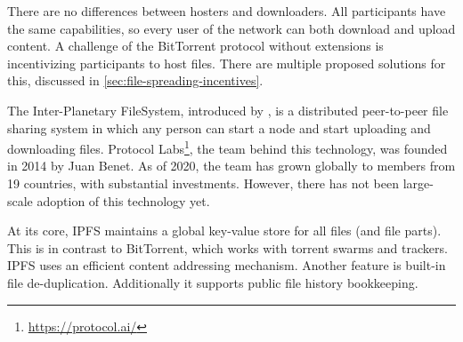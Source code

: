 


There are no differences between hosters and downloaders. All participants have the same capabilities, so every user of the network can both download and upload content. A challenge of the BitTorrent protocol without extensions is incentivizing participants to host files. There are multiple proposed solutions for this, discussed in \ref{sec:file-spreading-incentives}.

The Inter-Planetary FileSystem, introduced by \cite{benet2014ipfs}, is a distributed peer-to-peer file sharing system in which any person can start a node and start uploading and downloading files. Protocol Labs\footnote{\url{https://protocol.ai/}}, the team behind this technology, was founded in 2014 by Juan Benet. As of 2020, the team has grown globally to members from 19 countries, with substantial investments. However, there has not been large-scale adoption of this technology yet.


At its core, IPFS maintains a global key-value store for all files (and file parts). This is in contrast to BitTorrent, which works with torrent swarms and trackers. IPFS uses an efficient content addressing mechanism. Another feature is built-in file de-duplication. Additionally it supports public file history bookkeeping.

